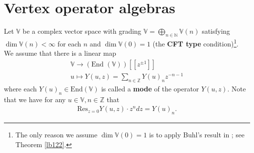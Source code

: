 \documentclass[12pt,a4paper,notitlepage]{report}
\theoremstyle{definition}
\theoremstyle{plain}
\newcommand{\End}{\mathrm{End}} %
\newcommand{\Res}{\mathrm{Res}}
\newcommand{\mbb}{\mathbb}
\newcommand{\Vbb}{\mathbb V}
\numberwithin{equation}{section}
\begin{document}
\section{Vertex operator algebras}
Let $\mbb V$ be a  complex vector space with grading $\mbb V=\bigoplus_{n\in\mathbb N}\mbb V(n)$ satisfying $\dim \mbb V(n)<\infty$ for each $n$ and $\dim\Vbb(0)=1$ (the \textbf{CFT type} condition)\footnote{The only reason we assume $\dim\Vbb(0)=1$ is to apply Buhl's result in \cite{Buhl02}; see Theorem \ref{lb122}.}.   We assume that there is a linear map
\begin{gather}
\mbb V\rightarrow(\text{End }(\mbb V))[[z^{\pm1}]]\nonumber\\
u\mapsto Y(u,z)=\sum_{n\in\mathbb Z}Y(u)_n z^{-n-1}\label{eq50}
\end{gather}
where each  $Y(u)_n\in\End(\Vbb)$ is called a \textbf{mode} of the operator $Y(u,z)$. Note that we have for any $u\in \Vbb,n\in\mbb Z$ that
\begin{align}
\Res_{z=0} Y(u,z)\cdot z^ndz=Y(u)_n.\label{eq36}
\end{align}
\end{document}
